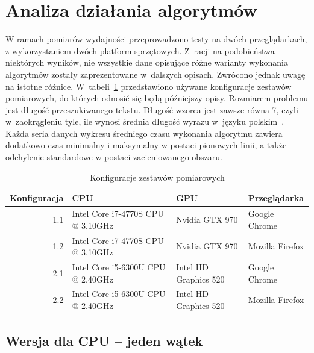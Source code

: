 
\section{Analiza działania algorytmów}

W ramach pomiarów wydajności przeprowadzono testy na dwóch przeglądarkach, z wykorzystaniem dwóch platform sprzętowych. Z~racji na podobieństwa niektórych wyników, nie wszystkie dane opisujące różne warianty wykonania algorytmów zostały zaprezentowane w~dalszych opisach. Zwrócono jednak uwagę na istotne różnice. W~tabeli~\ref{tab:1} przedstawiono używane konfiguracje zestawów pomiarowych, do których odnosić się będą późniejszy opisy. Rozmiarem problemu jest długość przeszukiwanego tekstu. Długość wzorca jest zawsze równa 7, czyli w~zaokrągleniu tyle, ile wynosi średnia długość wyrazu w~języku polskim~\cite{Polski}. Każda seria danych wykresu średniego czasu wykonania algorytmu zawiera dodatkowo czas minimalny i maksymalny w postaci pionowych linii, a także odchylenie standardowe w postaci zacieniowanego obszaru.
\begin{table}[H]
    \centering
    \begin{tabular}{ |r l l l|  }
        \hline
        Konfiguracja & CPU                               & GPU                   & Przeglądarka    \\
        \hline
        \hline
        1.1          & Intel Core i7-4770S CPU @ 3.10GHz & Nvidia GTX 970        & Google Chrome   \\
        1.2          & Intel Core i7-4770S CPU @ 3.10GHz & Nvidia GTX 970        & Mozilla Firefox \\
        2.1          & Intel Core i5-6300U CPU @ 2.40GHz & Intel HD Graphics 520 & Google Chrome   \\
        2.2          & Intel Core i5-6300U CPU @ 2.40GHz & Intel HD Graphics 520 & Mozilla Firefox \\
        \hline
    \end{tabular}
    \caption{Konfiguracje zestawów pomiarowych}
    \label{tab:1}
\end{table}

\subsection{Wersja dla CPU -- jeden wątek}

